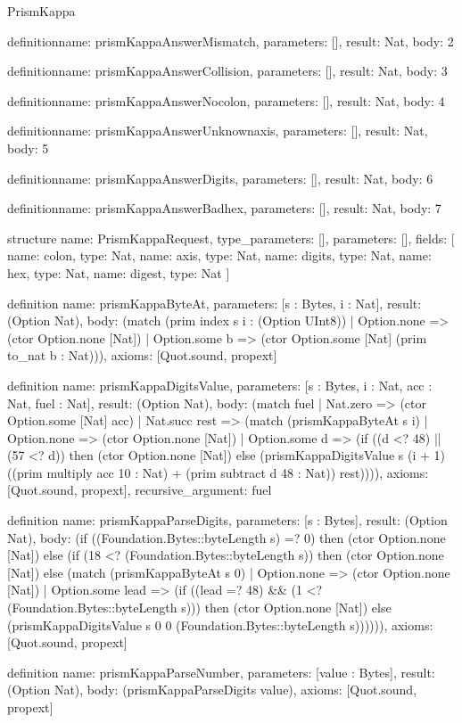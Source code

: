 \begin{lexlean}{PrismKappa}
\begin{semanticmodule}
definition{name: prismKappaAnswerMismatch, parameters: [], result: Nat, body: 2}

definition{name: prismKappaAnswerCollision, parameters: [], result: Nat, body: 3}

definition{name: prismKappaAnswerNocolon, parameters: [], result: Nat, body: 4}

definition{name: prismKappaAnswerUnknownaxis, parameters: [], result: Nat, body: 5}

definition{name: prismKappaAnswerDigits, parameters: [], result: Nat, body: 6}

definition{name: prismKappaAnswerBadhex, parameters: [], result: Nat, body: 7}

structure{
  name: PrismKappaRequest,
  type_parameters: [],
  parameters: [],
  fields: [
    {name: colon, type: Nat},
    {name: axis, type: Nat},
    {name: digits, type: Nat},
    {name: hex, type: Nat},
    {name: digest, type: Nat}
  ]
}

definition{
  name: prismKappaByteAt,
  parameters: [s : Bytes, i : Nat],
  result: (Option Nat),
  body: (match (prim index s i : (Option UInt8))
    | Option.none => (ctor Option.none [Nat])
    | Option.some b => (ctor Option.some [Nat] (prim to_nat b : Nat))),
  axioms: [Quot.sound, propext]
}

definition{
  name: prismKappaDigitsValue,
  parameters: [s : Bytes, i : Nat, acc : Nat, fuel : Nat],
  result: (Option Nat),
  body: (match fuel
    | Nat.zero => (ctor Option.some [Nat] acc)
    | Nat.succ rest => (match (prismKappaByteAt s i)
      | Option.none => (ctor Option.none [Nat])
      | Option.some d => (if ((d <? 48) || (57 <? d)) then (ctor Option.none [Nat]) else (prismKappaDigitsValue s (i + 1) ((prim multiply acc 10 : Nat) + (prim subtract d 48 : Nat)) rest)))),
  axioms: [Quot.sound, propext],
  recursive_argument: fuel
}

definition{
  name: prismKappaParseDigits,
  parameters: [s : Bytes],
  result: (Option Nat),
  body: (if ((Foundation.Bytes::byteLength s) =? 0) then (ctor Option.none [Nat]) else (if (18 <? (Foundation.Bytes::byteLength s)) then (ctor Option.none [Nat]) else (match (prismKappaByteAt s 0)
    | Option.none => (ctor Option.none [Nat])
    | Option.some lead => (if ((lead =? 48) && (1 <? (Foundation.Bytes::byteLength s))) then (ctor Option.none [Nat]) else (prismKappaDigitsValue s 0 0 (Foundation.Bytes::byteLength s)))))),
  axioms: [Quot.sound, propext]
}

definition{
  name: prismKappaParseNumber,
  parameters: [value : Bytes],
  result: (Option Nat),
  body: (prismKappaParseDigits value),
  axioms: [Quot.sound, propext]
}


\end{semanticmodule}
\end{lexlean}
